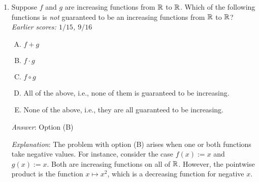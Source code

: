 \documentclass[10pt]{amsart}
\begin{document}
\begin{enumerate}
  \begin{enumerate}[(A)]
  \item $f + g$, i.e., the function $x \mapsto f(x) + g(x)$
  \item $f - g$, i.e., the function $x \mapsto f(x) - g(x)$
  \item $f \cdot g$, i.e., the function $x \mapsto f(x)g(x)$
  \item $f \circ g$, i.e., the function $x \mapsto f(g(x))$
  \item None of the above, i.e., they are all guaranteed to be right
    continuous functions
  \end{enumerate}

  {\em Answer}: Option (D)

  {\em Explanation}: See the explanation for Question 2 on the October
  1 quiz. Note that that quiz uses left continuity, but the example
  can be adapted to right continuity.

  {\em Performance review}: $10$ out of $11$ got this. $1$ chose (B).

  {\em Historical note (last year)}: $20$ out of $28$ people got this
  correct. $4$ people chose (C), $2$ people chose (B), $1$ person
  chose (E), and $1$ person left the question blank.
\item Suppose $f$ and $g$ are increasing functions from $\mathbb{R}$ to
  $\mathbb{R}$. Which of the following functions is {\em not} guaranteed to be
  an increasing functions from $\mathbb{R}$ to $\mathbb{R}$? {\em Earlier scores:
  $1/15$, $9/16$}

  \begin{enumerate}[(A)]

  \item $f + g$
  \item $f \cdot g$
  \item $f \circ g$
  \item All of the above, i.e., none of them is guaranteed to be increasing.
  \item None of the above, i.e., they are all guaranteed to be increasing.
  \end{enumerate}

      {\em Answer}: Option (B)

  {\em Explanation}: The problem with option (B) arises when one or
  both functions take negative values. For instance, consider the case
  $f(x) := x$ and $g(x) := x$. Both are increasing functions on all of
  $\mathbb{R}$. However, the pointwise product is the function $x \mapsto
  x^2$, which is a decreasing function for negative $x$.


\end{enumerate}
\end{document}
